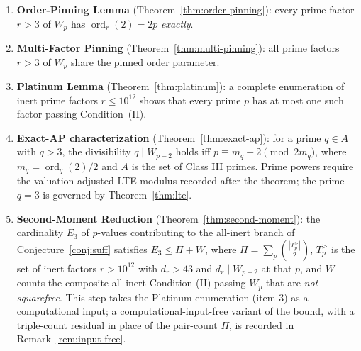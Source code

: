 \documentclass[11pt]{amsart}
\theoremstyle{plain}
\theoremstyle{definition}
\theoremstyle{remark}
\numberwithin{equation}{section}
\newcommand{\ord}{\operatorname{ord}}
\begin{document}
\begin{enumerate}
\item \textbf{Order-Pinning Lemma} (Theorem~\ref{thm:order-pinning}): every prime factor $r > 3$ of $W_p$ has $\ord_r(2) = 2p$ \emph{exactly}.
\item \textbf{Multi-Factor Pinning} (Theorem~\ref{thm:multi-pinning}): all prime factors $r > 3$ of $W_p$ share the pinned order parameter.
\item \textbf{Platinum Lemma} (Theorem~\ref{thm:platinum}): a complete enumeration of inert prime factors $r \leq 10^{12}$ shows that every prime $p$ has at most one such factor passing Condition~(II).
\item \textbf{Exact-AP characterization} (Theorem~\ref{thm:exact-ap}): for a prime $q \in A$ with $q > 3$, the divisibility $q \mid W_{p-2}$ holds iff $p \equiv m_q + 2 \pmod{2 m_q}$, where $m_q = \ord_q(2)/2$ and $A$ is the set of Class III primes. Prime powers require the valuation-adjusted LTE modulus recorded after the theorem; the prime $q = 3$ is governed by Theorem~\ref{thm:lte}.
\item \textbf{Second-Moment Reduction} (Theorem~\ref{thm:second-moment}): the cardinality $E_3$ of $p$-values contributing to the all-inert branch of Conjecture~\ref{conj:suff} satisfies $E_3 \leq \Pi + W$, where $\Pi = \sum_p \binom{|T_p^{>}|}{2}$, $T_p^{>}$ is the set of inert factors $r > 10^{12}$ with $d_r > 43$ and $d_r \mid W_{p-2}$ at that $p$, and $W$ counts the composite all-inert Condition-(II)-passing $W_p$ that are \emph{not squarefree}. This step takes the Platinum enumeration (item 3) as a computational input; a computational-input-free variant of the bound, with a triple-count residual in place of the pair-count $\Pi$, is recorded in Remark~\ref{rem:input-free}.
\end{enumerate}
\end{document}
